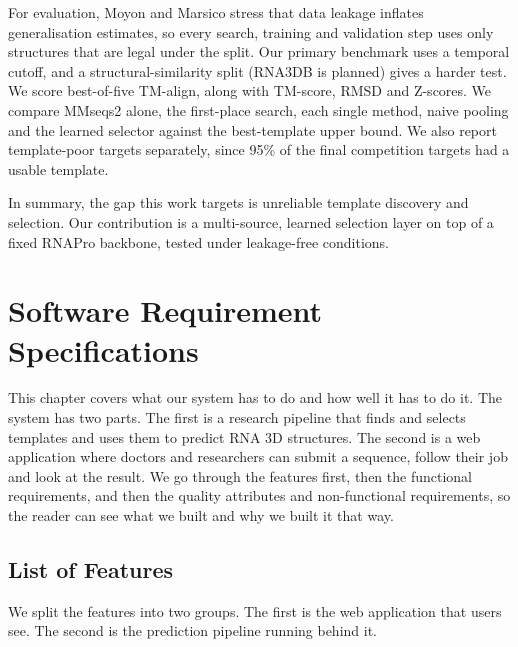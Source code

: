\documentclass{FastFyp}
\begin{document}
For evaluation, Moyon and Marsico \cite{moyon2026ml} stress that data leakage inflates generalisation estimates, so every search, training and validation step uses only structures that are legal under the split. Our primary benchmark uses a temporal cutoff, and a structural-similarity split (RNA3DB is planned) gives a harder test. We score best-of-five TM-align, along with TM-score, RMSD and Z-scores. We compare MMseqs2 alone, the first-place search, each single method, naive pooling and the learned selector against the best-template upper bound. We also report template-poor targets separately, since 95\% of the final competition targets had a usable template.

In summary, the gap this work targets is unreliable template discovery and selection. Our contribution is a multi-source, learned selection layer on top of a fixed RNAPro backbone, tested under leakage-free conditions.

\clearpage


\chapter{Software Requirement Specifications}
\label{ch:srs}
This chapter covers what our system has to do and how well it has to do it. The system has two parts. The first is a research pipeline that finds and selects templates and uses them to predict RNA 3D structures. The second is a web application where doctors and researchers can submit a sequence, follow their job and look at the result. We go through the features first, then the functional requirements, and then the quality attributes and non-functional requirements, so the reader can see what we built and why we built it that way.

\section{List of Features}
We split the features into two groups. The first is the web application that users see. The second is the prediction pipeline running behind it.
\end{document}
